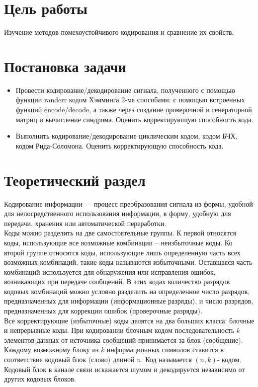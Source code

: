 \documentclass[a4paper]{article}
\begin{document}
\vfill %

\section{Цель работы}
Изучение методов помехоустойчивого кодирования и сравнение их свойств.

\section{Постановка задачи}
\begin{itemize}
	\item Провести кодирование/декодирование сигнала, полученного с помощью функции randerr кодом Хэмминга 2-мя способами: с помощью встроенных функций encode/decode, а также через	создание проверочной и генераторной матриц и вычисление синдрома. Оценить корректирующую способность кода.
	\item Выполнить кодирование/декодирование циклическим кодом, кодом БЧХ, кодом Рида-Соломона. Оценить корректирующую способность кода.
\end{itemize}


\section{Теоретический раздел}
Кодирование информации — процесс преобразования сигнала из формы, удобной для непосредственного использования информации, в форму, удобную для передачи, хранения или автоматической переработки.\\

Коды можно разделить на две самостоятельные группы. К первой относятся коды, использующие все возможные комбинации – неизбыточные коды. Ко второй группе относятся коды, использующие лишь определенную часть всех возможных комбинаций, такие коды называются избыточными. Оставшаяся часть комбинаций используется для обнаружения или исправления ошибок, возникающих при передаче сообщений. В этих кодах количество разрядов кодовых комбинаций можно условно разделить на определенное число разрядов, предназначенных для информации (информационные разряды), и число разрядов, предназначенных для коррекции ошибок (проверочные разряды).\\

Все корректирующие (избыточные) коды делятся на два больших класса: блочные и непрерывные коды. При кодировании блочным кодом последовательность $k$ элементов данных от источника сообщений принимается за блок (сообщение). Каждому возможному блоку из $k$ информационных символов ставится в соответствие кодовый блок (слово) длиной $n$. Код называется $(n,k)$- кодом. Кодовый блок в канале связи искажается шумом и декодируется независимо от других кодовых блоков.\\
\end{document}
